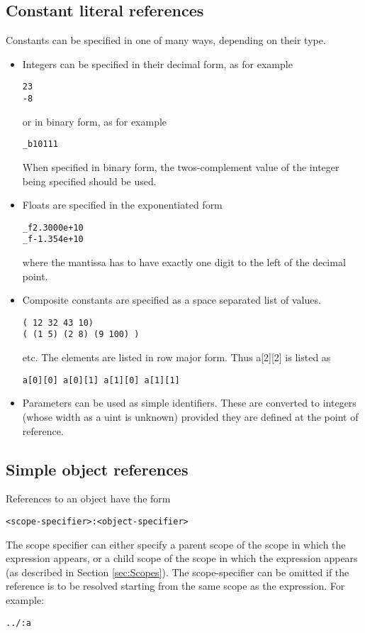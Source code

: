 \documentclass{article}
\begin{document}
\subsection{Constant literal references} 

Constants can be specified in one of many
ways, depending on their type.
\begin{itemize}
\item Integers can be specified in their
decimal form, as for example 
\begin{verbatim}
23
-8
\end{verbatim}
or in binary form, as for example
\begin{verbatim}
_b10111
\end{verbatim}
When specified in binary form, the twos-complement
value of the integer being specified should be
used.
\item Floats are specified in the exponentiated
form
\begin{verbatim}
_f2.3000e+10
_f-1.354e+10
\end{verbatim}
where the mantissa has to have exactly one digit
to the left of the decimal point.
\item Composite constants are specified
as a space separated list of values.
\begin{verbatim}
( 12 32 43 10)
( (1 5) (2 8) (9 100) )
\end{verbatim}
etc.  The elements are listed in 
row major form.  Thus a[2][2] is
listed as
\begin{verbatim}
a[0][0] a[0][1] a[1][0] a[1][1]
\end{verbatim}
\item Parameters can be used as simple identifiers.
These are converted to integers (whose width as a uint
is unknown) provided they are defined at the point
of reference.
\end{itemize}

\subsection{Simple object references} 

References to an object have the form
\begin{verbatim}
<scope-specifier>:<object-specifier>
\end{verbatim}
The scope specifier can either specify a
parent scope of the scope in which the expression appears,
or a child scope of the scope in which the 
expression appears (as described in Section \ref{sec:Scopes}).  
The scope-specifier can be omitted
if the reference is to be resolved starting from the same scope
as the expression.
For example:
\begin{verbatim}
../:a
\end{verbatim}
\end{document}
